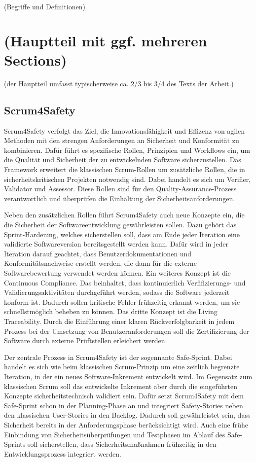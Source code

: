 \documentclass[acmtog]{acmart}
\begin{document}
(Begriffe und Definitionen)


\section{(Hauptteil mit ggf. mehreren Sections)}

(der Hauptteil umfasst typischerweise ca. 2/3 bis 3/4 des Texts der Arbeit.)

\subsection{Scrum4Safety}

Scrum4Safety verfolgt das Ziel, die Innovationsfähigkeit und Effizenz von agilen Methoden mit den strengen Anforderungen an Sicherheit und Konformität zu kombinieren.
Dafür führt es spezifische Rollen, Prinzipien und Workflows ein, um die Qualität und Sicherheit der zu entwickelnden Software sicherzustellen. Das Framework
erweitert die klassischen Scrum-Rollen um zusätzliche Rollen, die in sicherheitskritischen Projekten notwendig sind. Dabei handelt es sich um Verifier, Validator und Assessor.
Diese Rollen sind für den Quality-Assurance-Prozess verantwortlich und überprüfen die Einhaltung der Sicherheitsanforderungen. 

Neben den zusätzlichen Rollen führt Scrum4Safety auch neue Konzepte ein, die die Sicherheit der Softwareentwicklung gewährleisten sollen. Dazu gehört das Sprint-Hardening,
welches sicherstellen soll, dass am Ende jeder Iteration eine validierte Softwareversion bereitsgestellt werden kann. Dafür wird in jeder Iteration darauf geachtet, 
dass Benutzerdokumentationen und Konformitätsnachweise erstellt werden, die dann für die externe Softwarebewertung verwendet werden können. 
Ein weiteres Konzept ist die Continuous Compliance. Das beinhaltet, dass kontinuierlich Verfifizierungs- und Validierungsaktivitäten durchgeführt werden, sodass die Software
jederzeit konform ist. Dadurch sollen kritische Fehler frühzeitig erkannt werden, um sie schnellstmöglich beheben zu können. Das dritte Konzept ist die Living Traceability.
Durch die Einführung einer klaren Rückverfolgbarkeit in jedem Prozess bei der Umsetzung von Benutzeranforderungen soll die Zertifizierung 
der Software durch externe Prüftstellen erleichert werden. \cite{andriadi_impact_2023}

Der zentrale Prozess in Scrum4Safety ist der sogennante Safe-Sprint. Dabei handelt es sich wie beim klassischen Scrum-Prinzip um eine zeitlich begrenzte Iteration, in 
der ein neues Software-Inkrement entwickelt wird. Im Gegensatz zum klassischen Scrum soll das entwickelte Inkrement aber durch die eingeführten Konzepte sicherheitstechnisch
validiert sein. Dafür setzt Scrum4Safety mit dem Safe-Sprint schon in der Planning-Phase an und integriert Safety-Stories neben den klassischen User-Stories in den Backlog.
Dadurch soll gewährleistet sein, dass Sicherheit bereits in der Anforderungsphase berücksichtigt wird. Auch eine frühe Einbindung von Sicherheitsüberprüfungen und Testphasen im Ablauf 
des Safe-Sprints soll sicherstellen, dass Sicherheitsmaßnahmen frühzeitig in den Entwicklungsprozess integriert werden. 
\end{document}

